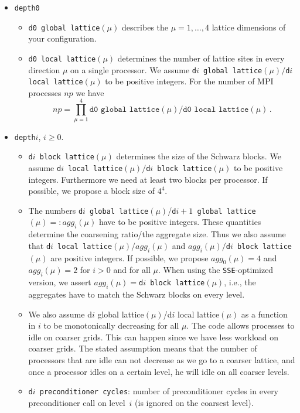 \documentclass[a4paper,12pt]{scrartcl}
\begin{document}
\begin{itemize}
\item \texttt{depth0}
  \begin{itemize}
    \item \texttt{d0 global lattice}$(\mu)$ describes the $\mu=1,\ldots,4$ lattice dimensions of your configuration.
    \item \texttt{d0 local lattice}$(\mu)$ determines the number of lattice sites in every direction $\mu$ on a single processor. We assume \texttt{d$i$ global lattice}$(\mu)/$\texttt{d$i$ local lattice}$(\mu)$ to be positive integers.
    For the number of MPI processes $np$ we have
    $$ np = \prod_{\mu=1}^4 \texttt{d0 global lattice}(\mu)/\texttt{d0 local lattice}(\mu) \, . $$
  \end{itemize}
\item \texttt{depth$i$}, $i \geq 0$.
  \begin{itemize}
    \item \texttt{d$i$ block lattice}$(\mu)$ determines the size of the Schwarz blocks. We assume \texttt{d$i$ local lattice}$(\mu)/$\texttt{d$i$ block lattice}$(\mu)$ to be positive integers. Furthermore we need at least two blocks per processor. If possible, we propose a block size of $4^4$.
    \item The numbers \texttt{d$i$ global lattice}$(\mu)$/\texttt{d$i+1$ global lattice}$(\mu) =: agg_i(\mu)$ have to be positive integers. These quantities determine the coarsening ratio/the aggregate size. Thus we also assume that \texttt{d$i$ local lattice}$(\mu)/agg_i(\mu)$ and $agg_i(\mu)/$\texttt{d$i$ block lattice}$(\mu)$ are positive integers. If possible, we propose $agg_0(\mu)=4$ and $agg_i(\mu)=2$ for $i>0$ and for all $\mu$. When using the \texttt{SSE}-optimized version, we assert  $agg_i(\mu)=$\texttt{d$i$ block lattice}$(\mu)$, i.e., the aggregates have to match the Schwarz blocks on every level.
    \item We also assume d$i$ global lattice$(\mu)$/d$i$ local lattice$(\mu)$ as a function in $i$ to be monotonically decreasing for all $\mu$. The code allows processes to idle on coarser grids. This can happen since we have less workload on coarser grids. The stated assumption means that the number of processors that are idle can not decrease as we go to a coarser lattice, and once a processor idles on a certain level, he will idle on all coarser levels.    
    \item \texttt{d$i$ preconditioner cycles}: number of preconditioner cycles in every preconditioner call on level~$i$ (is ignored on the coarsest level).

\end{itemize}
\end{itemize}
\end{document}

